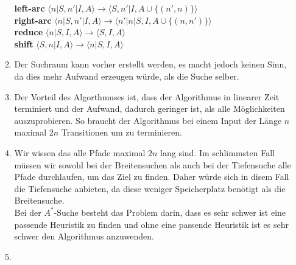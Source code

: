\documentclass[a4paper]{scrartcl}
\begin{document}
\begin{enumerate}
\begin{enumerate}
		       \textbf{left-arc}   $\langle n|S,n'|I,A\rangle \rightarrow \langle S,n'|I,A \cup \{(n',n)\}\rangle$ \\
	            \textbf{right-arc} $\langle n |S, n' | I, A \rangle \rightarrow \langle n'|n|S, I, A \cup \{(n, n')\}\rangle$ \\
	            \textbf{reduce} $\langle n|S,I,A\rangle \rightarrow \langle S,I,A \rangle$ \\
	            \textbf{shift} $\langle S,n|I,A\rangle \rightarrow \langle n|S,I,A \rangle$ \\
				
			\item
				Der Suchraum kann vorher erstellt werden, es macht jedoch keinen Sinn, da dies
				mehr Aufwand erzeugen würde, als die Suche selber. \\
				
			\item
				Der Vorteil des Algorthmuses ist, dass der Algorithmus in linearer Zeit terminiert und der
				Aufwand, dadurch geringer ist, als alle Möglichkeiten auszuprobieren. So braucht der 
				Algorithmus bei einem Input der Länge $n$ maximal $2n$ Transitionen um zu terminieren.
				
			\item
				Wir wissen das alle Pfade maximal $2n$ lang sind. Im schlimmsten Fall müssen wir 
				sowohl bei der Breitensuchen als auch bei der Tiefensuche alle Pfade durchlaufen, um
				das Ziel zu finden. Daher würde sich in disem Fall die Tiefensuche anbieten, da diese
				weniger Speicherplatz benötigt als die Breitensuche. \\
				Bei der $A^*$-Suche besteht das Problem darin, dass es sehr schwer ist eine passende
				Heuristik zu finden und ohne eine passende Heuristik ist es sehr schwer den Algorithmus
				anzuwenden. \\
				
			\item
				
				
				
				
				
		\end{enumerate}

\end{enumerate}
\end{document}

